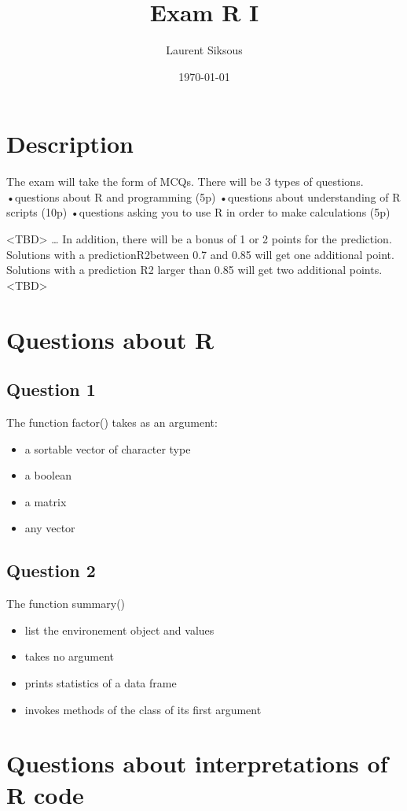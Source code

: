 \documentclass[11pt]{article}
\author{Laurent Siksous}
\date{\today}
\title{Exam R I}
\begin{document}
\maketitle
\section*{Description}
\label{sec:org27c1d9f}
The exam will take the form of MCQs. There will be 3 types of questions.
•questions about R and programming (5p)
•questions about understanding of R scripts (10p)
•questions asking you to use R in order to make calculations (5p)

<TBD>
\ldots{} In addition, there will be a bonus of 1 or 2 points for the prediction.
Solutions with a predictionR2between 0.7 and 0.85 will get one additional
point. Solutions with a prediction R2 larger than 0.85 will get two additional
points.
<TBD>

\section*{Questions about R}
\label{sec:orgd29dbd5}
\subsection*{Question 1}
\label{sec:org47837d8}
The function factor() takes as an argument:
\begin{itemize}
\item a sortable vector of character type
\item a boolean
\item a matrix
\item any vector
\end{itemize}
\subsection*{Question 2}
\label{sec:org2881b24}
The function summary()
\begin{itemize}
\item list the environement object and values
\item takes no argument
\item prints statistics of a data frame
\item invokes methods of the class of its first argument
\end{itemize}
\section*{Questions about interpretations of R code}
\label{sec:org5c9b29e}
\end{document}
